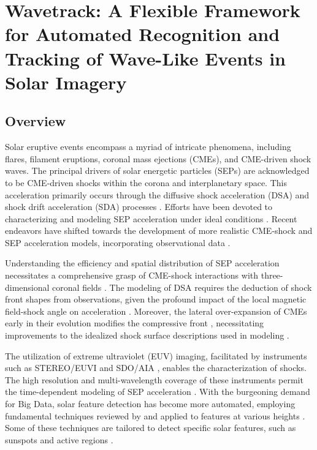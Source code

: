 
\section{Wavetrack: A Flexible Framework for Automated Recognition and Tracking of Wave-Like Events in Solar Imagery}
\subsection{Overview}
Solar eruptive events encompass a myriad of intricate phenomena, including flares, filament eruptions, coronal mass ejections (CMEs), and CME-driven shock waves. The principal drivers of solar energetic particles (SEPs) are acknowledged to be CME-driven shocks within the corona and interplanetary space. This acceleration primarily occurs through the diffusive shock acceleration (DSA) and shock drift acceleration (SDA) processes \citep{reames_2021}. Efforts have been devoted to characterizing and modeling SEP acceleration under ideal conditions \citep{vainio_2008, sokolov_2009, kozarev_2013}. Recent endeavors have shifted towards the development of more realistic CME-shock and SEP acceleration models, incorporating observational data \citep{vourlidas_2012, kwon_2014, kozarev_2015, kozarev_2019}.

Understanding the efficiency and spatial distribution of SEP acceleration necessitates a comprehensive grasp of CME-shock interactions with three-dimensional coronal fields \cite{rouillard_2016}. The modeling of DSA requires the deduction of shock front shapes from observations, given the profound impact of the local magnetic field-shock angle on acceleration \cite{guo_2013}. Moreover, the lateral over-expansion of CMEs early in their evolution modifies the compressive front \cite{bein_2011, temmer_2016}, necessitating improvements to the idealized shock surface descriptions used in modeling \citep{vourlidas_2012, kwon_2014, rouillard_2016}.

The utilization of extreme ultraviolet (EUV) imaging, facilitated by instruments such as STEREO/EUVI \citep{wuelser_2004} and SDO/AIA \citep{lemen_2012}, enables the characterization of shocks. The high resolution and multi-wavelength coverage of these instruments permit the time-dependent modeling of SEP acceleration \citep{kozarev_2016, kozarev_2017, kozarev_2019}. With the burgeoning demand for Big Data, solar feature detection has become more automated, employing fundamental techniques reviewed by \citet{aschwanden_2010} and applied to features at various heights \citep{perez_Suarez_2011}. Some of these techniques are tailored to detect specific solar features, such as sunspots and active regions \citep{curto_2008}.

